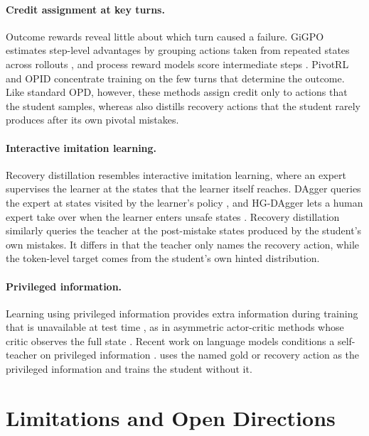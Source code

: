 \paragraph{Credit assignment at key turns.} Outcome rewards reveal little about which turn caused a failure. GiGPO estimates step-level advantages by grouping actions taken from repeated states across rollouts \citep{feng2025gigpo}, and process reward models score intermediate steps \citep{lightman2023prm,wang2024mathshepherd}. PivotRL \citep{yi2026pivotrl} and OPID \citep{yang2026opid} concentrate training on the few turns that determine the outcome. Like standard OPD, however, these methods assign credit only to actions that the student samples, whereas \method{} also distills recovery actions that the student rarely produces after its own pivotal mistakes.

\paragraph{Interactive imitation learning.} Recovery distillation resembles interactive imitation learning, where an expert supervises the learner at the states that the learner itself reaches. DAgger queries the expert at states visited by the learner's policy \citep{ross2011reduction}, and HG-DAgger lets a human expert take over when the learner enters unsafe states \citep{kelly2019hgdagger}. Recovery distillation similarly queries the teacher at the post-mistake states produced by the student's own mistakes. It differs in that the teacher only names the recovery action, while the token-level target comes from the student's own hinted distribution.

\paragraph{Privileged information.} Learning using privileged information provides extra information during training that is unavailable at test time \citep{vapnik2009lupi}, as in asymmetric actor-critic methods whose critic observes the full state \citep{pinto2018asymmetric}. Recent work on language models conditions a self-teacher on privileged information \citep{zhao2026opsd,penaloza2026pid, he2026sdzero, kaur2026rethinking, liu2026mixsd}. \method{} uses the named gold or recovery action as the privileged information and trains the student without it.

\section{Limitations and Open Directions}
\label{app:limitations}

